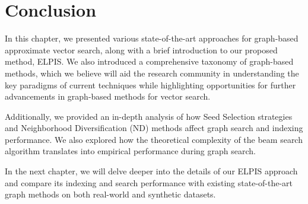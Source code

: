 \section{Conclusion}
In this chapter, we presented various state-of-the-art approaches for graph-based approximate vector search, along with a brief introduction to our proposed method, ELPIS. We also introduced a comprehensive taxonomy of graph-based methods, which we believe will aid the research community in understanding the key paradigms of current techniques while highlighting opportunities for further advancements in graph-based methods for vector search. 

Additionally, we provided an in-depth analysis of how Seed Selection strategies and Neighborhood Diversification (ND) methods affect graph search and indexing performance. We also explored how the theoretical complexity of the beam search algorithm translates into empirical performance during graph search. 

In the next chapter, we will delve deeper into the details of our ELPIS approach and compare its indexing and search performance with existing state-of-the-art graph methods on both real-world and synthetic datasets.

